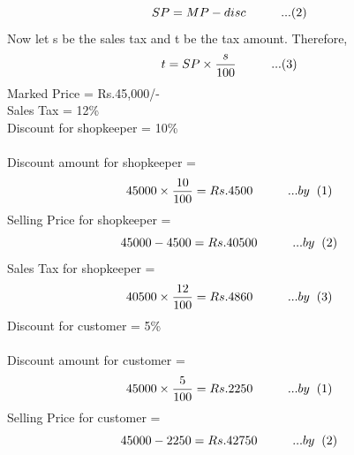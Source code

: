 \documentclass[12pt, twocolumn]{article}
\begin{document}
\begin{equation*}
    SP = MP - disc \hspace{1cm}...(2)\\ \\
\end{equation*}
Now let s be the sales tax and t be the tax amount. Therefore,\\
\begin{equation*}
    t = SP\times\frac{s}{100} \hspace{1cm}...(3)\\ \\ \\
\end{equation*}
Marked  Price = Rs.45,000/- \\
Sales  Tax = 12\% \\
Discount  for  shopkeeper = 10\% \\ \\
Discount  amount for shopkeeper =  \begin{equation*}
    45000\times\frac{10}{100} = Rs.4500 \hspace{1cm}... by \hspace{0.2cm} (1)\\ 
    \end{equation*} 
Selling Price for shopkeeper = \begin{equation*}
    45000 - 4500 = Rs.40500 \hspace{1cm}... by \hspace{0.2cm} (2)\\
\end{equation*}
Sales Tax for shopkeeper = \begin{equation*} \\
    40500\times\frac{12}{100} =  Rs.4860 \hspace{1cm}... by \hspace{0.2cm} (3)\\
\end{equation*}
Discount for customer = 5\% \\ \\
Discount amount for customer  = 
\begin{equation*} 
     45000\times\frac{5}{100} = Rs.2250 \hspace{1cm}... by \hspace{0.2cm} (1)\\
    \end{equation*}
Selling Price for customer = \begin{equation*}\\
    45000 - 2250 =  Rs.42750 \hspace{1cm}... by \hspace{0.2cm} (2)\\ 
\end{equation*}
\end{document}
